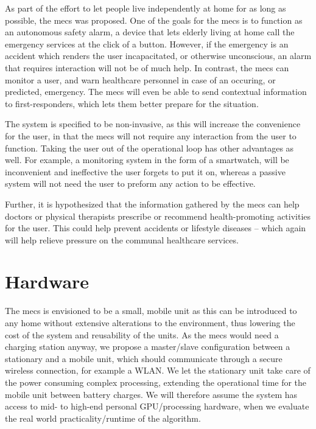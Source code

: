 As part of the effort to let people live independently at home for as long as possible, the \gls{mecs} was proposed. One of the goals for the \gls{mecs} is to function as an autonomous safety alarm, a device that lets elderly living at home call the emergency services at the click of a button. However, if the emergency is an accident which renders the user incapacitated, or otherwise unconscious, an alarm that requires interaction will not be of much help. In contrast, the \gls{mecs} can monitor a user, and warn healthcare personnel in case of an occuring, or predicted, emergency. The \gls{mecs} will even be able to send contextual information to first-responders, which lets them better prepare for the situation.

The system is specified to be non-invasive, as this will increase the convenience for the user, in that the \gls{mecs} will not require any interaction from the user to function. Taking the user out of the operational loop has other advantages as well. For example, a monitoring system in the form of a smartwatch, will be inconvenient and ineffective the user forgets to put it on, whereas a passive system will not need the user to preform any action to be effective.

Further, it is hypothesized that the information gathered by the \gls{mecs} can help doctors or physical therapists prescribe or recommend health-promoting activities for the user. This could help prevent accidents or lifestyle diseases -- which again will help relieve pressure on the communal healthcare services.

\section{Hardware}
The \gls{mecs} is envisioned to be a small, mobile unit as this can be introduced to any home without extensive alterations to the environment, thus lowering the cost of the system and reusability of the units. As the \gls{mecs} would need a charging station anyway, we propose a master/slave configuration between a stationary and a mobile unit, which should communicate through a secure wireless connection, for example a WLAN. We let the stationary unit take care of the power consuming complex processing, extending the operational time for the mobile unit between battery charges. We will therefore assume the system has access to mid- to high-end personal GPU/processing hardware, when we evaluate the real world practicality/runtime of the algorithm.

